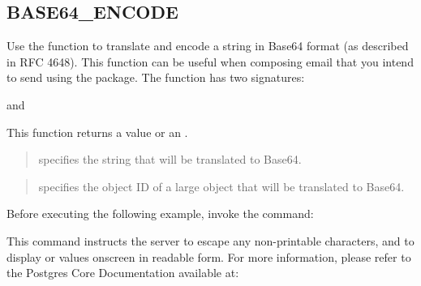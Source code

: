 \documentclass[letterpaper,10pt,english,openany,oneside]{sphinxmanual}
\begin{document}
\newpage


\subsection{BASE64\_ENCODE}
\label{\detokenize{base64_encode::doc}}\label{\detokenize{base64_encode:base64-encode}}
Use the  function to translate and encode a string in
Base64 format (as described in RFC 4648). This function can be useful
when composing  email that you intend to send using the 
package. The  function has two signatures:
\begin{quote}

\end{quote}

and
\begin{quote}

\end{quote}

This function returns a  value or an .


\begin{quote}

 specifies the  string that will be translated to Base64.
\end{quote}

\begin{quote}

 specifies the object ID of a large object that will be
translated to Base64.
\end{quote}


Before executing the following example, invoke the command:
\begin{quote}

\end{quote}

This command instructs the server to escape any non-printable
characters, and to display  or  values onscreen in readable
form. For more information, please refer to the Postgres Core
Documentation available at:
\end{document}
